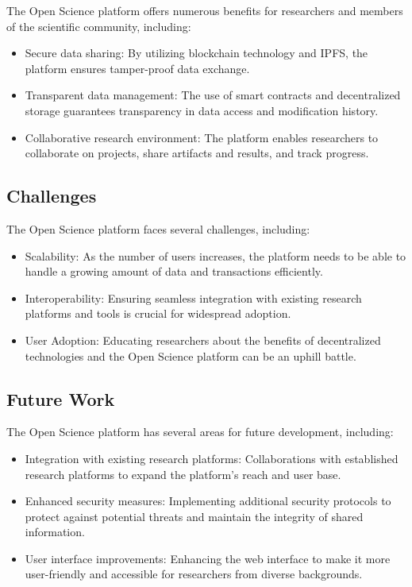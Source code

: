 \documentclass{article}
\begin{document}
The Open Science platform offers numerous benefits for researchers and members of the scientific community, including:

\begin{itemize}
      \item Secure data sharing: By utilizing blockchain technology and IPFS, the platform ensures tamper-proof data exchange.
      \item Transparent data management: The use of smart contracts and decentralized storage guarantees transparency in data access and modification history.
      \item Collaborative research environment: The platform enables researchers to collaborate on projects, share artifacts and results, and track progress.
\end{itemize}

\subsection{Challenges}

The Open Science platform faces several challenges, including:

\begin{itemize}
      \item Scalability: As the number of users increases, the platform needs to be able to handle a growing amount of data and transactions efficiently.
      \item Interoperability: Ensuring seamless integration with existing research platforms and tools is crucial for widespread adoption.
      \item User Adoption: Educating researchers about the benefits of decentralized technologies and the Open Science platform can be an uphill battle.
\end{itemize}

\subsection{Future Work}

The Open Science platform has several areas for future development, including:

\begin{itemize}
      \item Integration with existing research platforms: Collaborations with established research platforms to expand the platform's reach and user base.
      \item Enhanced security measures: Implementing additional security protocols to protect against potential threats and maintain the integrity of shared information.
      \item User interface improvements: Enhancing the web interface to make it more user-friendly and accessible for researchers from diverse backgrounds.
\end{itemize}
\end{document}
